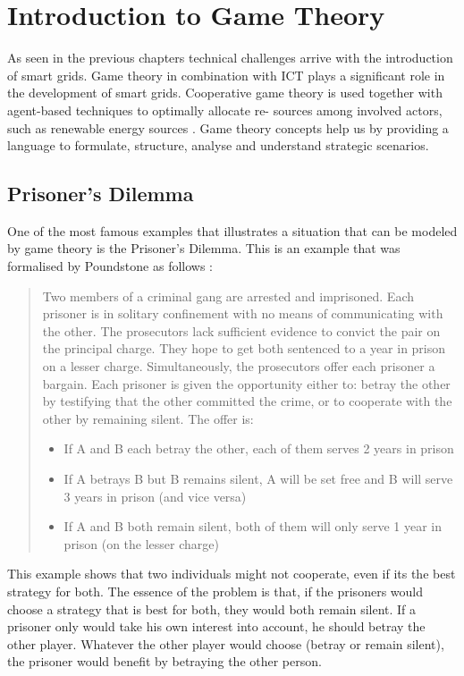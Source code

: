 \section{Introduction to Game Theory}
As seen in the previous chapters technical challenges arrive with the introduction of smart grids. Game theory in combination with ICT plays a significant role in the development of smart grids. Cooperative game theory is used together with agent-based techniques to optimally allocate re- sources among involved actors, such as renewable energy sources \cite{nguyen2013game}. Game theory concepts help us by providing a language to formulate, structure, analyse and understand strategic scenarios.


\subsection{Prisoner's Dilemma}
One of the most famous examples that illustrates a situation that can be modeled by game theory is the Prisoner's Dilemma. This is an example that was formalised by Poundstone as follows \cite{poundstone}: 

\begin{quote}
Two members of a criminal gang are arrested and imprisoned. Each prisoner is in solitary confinement with no means of communicating with the other. The prosecutors lack sufficient evidence to convict the pair on the principal charge. They hope to get both sentenced to a year in prison on a lesser charge. Simultaneously, the prosecutors offer each prisoner a bargain. Each prisoner is given the opportunity either to: betray the other by testifying that the other committed the crime, or to cooperate with the other by remaining silent. The offer is:
	\begin{itemize}
		\item If A and B each betray the other, each of them serves 2 years in prison
		\item If A betrays B but B remains silent, A will be set free and B will serve 3 years in prison (and vice versa)
		\item If A and B both remain silent, both of them will only serve 1 year in prison (on the lesser charge)
	\end{itemize}	
\end{quote}

This example shows that two individuals might not cooperate, even if its the best strategy for both. The essence of the problem is that, if the prisoners would choose a strategy that is best for both, they would both remain silent. If a prisoner only would take his own interest into account, he should betray the other player. Whatever the other player would choose (betray or remain silent), the prisoner would benefit by betraying the other person.

